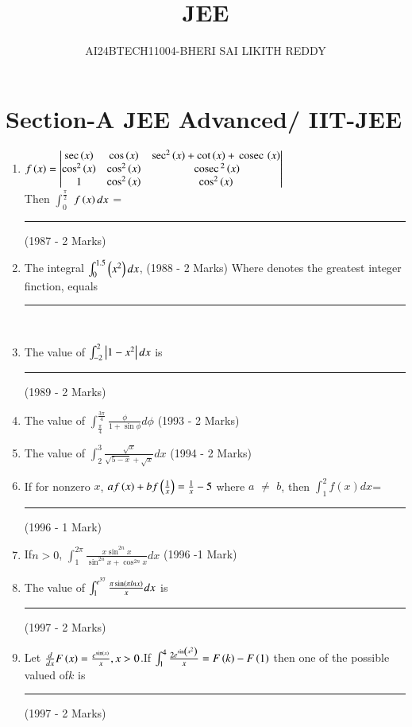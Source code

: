\documentclass[journal,12pt,twocolumn]{IEEEtran}
\theoremstyle{remark}
\begin{document}


\title{JEE}
\author{AI24BTECH11004-BHERI SAI LIKITH REDDY}
\maketitle
\newpage
\bigskip

\renewcommand{\thefigure}{\theenumi}
\renewcommand{\thetable}{\theenumi}

\section{Section-A JEE Advanced/ IIT-JEE}
\begin{enumerate}
	\item $f\left(x\right) = \begin{vmatrix}
			\sec\left(x\right) & \cos\left(x\right) &\sec^2\left(x\right)+\cot\left(x\right)+\,\text{cosec}\, \left(x\right)\\
		\cos^2\left(x\right) & \cos^2\left(x\right) & \,\text{cosec}\,^2\left(x\right)\\
		1 & \cos^2\left(x\right) & \cos^2\left(x\right)\end{vmatrix}$\\
	Then $\int_0^{\frac{\pi}{2}}$ $f\left(x\right)dx$ = \rule{1cm}{0.15mm}
\hfill{(1987 - 2 Marks)} 
		
\item The integral $\int_0^{1.5} \left(x^2\right)dx$,
\hfill{(1988 - 2 Marks)}
	Where \sbrak denotes the greatest integer finction, equals \rule{1cm}{0.15mm}  \\
		
\item The value of  $\int_{-2}^2 \left\vert1-x^2\right\vert dx$ is \rule{1cm}{0.15mm}
	\hfill{(1989 - 2 Marks)}
		
\item The value of $\int_{\frac{\pi}{4}}^{\frac{3\pi}{4}} \frac{\phi}{1+ \sin \phi} d\phi$
\hfill{(1993 - 2 Marks)}
		
\item The value of $\int_2^3 \frac{\sqrt x }{\sqrt {5-x}+\sqrt {x}} dx$
\hfill{(1994 - 2 Marks)}
		
\item If for nonzero $x$, $af\left(x\right)+bf \left(\frac{1}{x} \right) = \frac{1}{x}-5 $ where $a$ 
	$\neq$  $b$, then $\int_1^2f(x)dx$= \rule{1cm}{0.15mm}
\hfill{(1996 - 1 Mark)}
		
\item If$ n>0$, $\int_1^{2\pi} \frac {x \sin ^{2n}x}{\sin^{2n}x+\cos^{2n} x} dx $
\hfill{(1996 -1 Mark)}
		
\item The value of $\int_1^{e^{37}} \frac {\pi \sin \left(\pi lnx\right)}{x} dx$ is \rule{1cm}{0.15mm}

	\hfill{(1997 - 2 Marks)}
		
\item Let $\frac {d}{dx}F\left(x\right)=\frac {e^{\sin\left(x\right)}}{x},x>0$.If $\int_1^4 \frac{2e^{\sin \left(x^2\right)}}{x}=F\left(k\right)-F\left(1\right)$ then one of the possible valued of$ k$ is \rule{1cm}{0.15mm}
\hfill{(1997 - 2 Marks)}\\
\end{enumerate}
\end{document}
